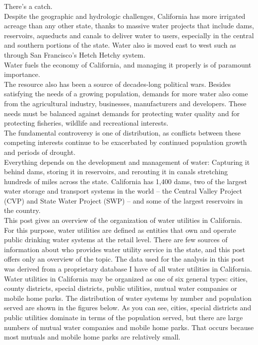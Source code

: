 \documentclass{article}
\begin{document}
There’s a catch. \\

Despite the geographic and hydrologic challenges, California has more irrigated acreage than any other state, thanks to massive water projects that include dams, reservoirs, aqueducts and canals to deliver water to users, especially in the central and southern portions of the state. Water also is moved east to west such as through San Francisco’s Hetch Hetchy system.\\

Water fuels the economy of California, and managing it properly is of paramount importance.\\

The resource also has been a source of decades-long political wars. Besides satisfying the needs of a growing population, demands for more water also come from the agricultural industry, businesses, manufacturers and developers. These needs must be balanced against demands for protecting water quality and for protecting fisheries, wildlife and recreational interests.\\

The fundamental controversy is one of distribution, as conflicts between these competing interests continue to be exacerbated by continued population growth and periods of drought.\\

Everything depends on the development and management of water: Capturing it behind dams, storing it in reservoirs, and rerouting it in canals stretching hundreds of miles across the state. California has 1,400 dams, two of the largest water storage and transport systems in the world – the Central Valley Project (CVP) and State Water Project (SWP) – and some of the largest reservoirs in the country.\\

This post gives an overview of the organization of water utilities in California. For this purpose, water utilities are defined as entities that own and operate public drinking water systems at the retail level. There are few sources of information about who provides water utility service in the state, and this post offers only an overview of the topic. The data used for the analysis in this post was derived from a proprietary database I have of all water utilities in California.\\

Water utilities in California may be organized as one of six general types: cities, county districts, special districts, public utilities, mutual water companies or mobile home parks. The distribution of water systems by number and population served are shown in the figures below. As you can see, cities, special districts and public utilities dominate in terms of the population served, but there are large numbers of mutual water companies and mobile home parks. That occurs because most mutuals and mobile home parks are relatively small.\\
\end{document}
